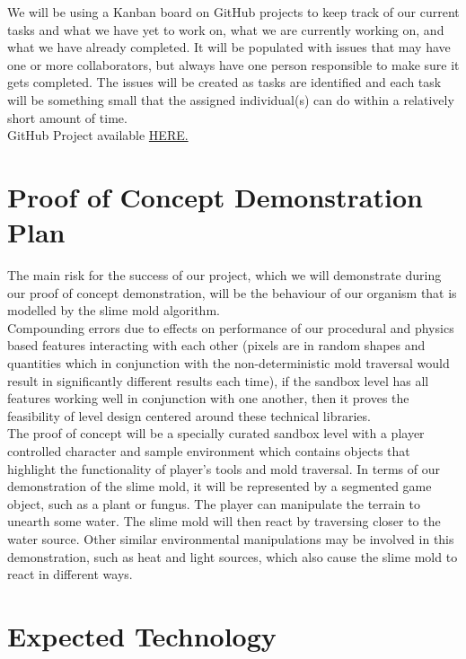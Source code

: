 \documentclass{article}
\begin{document}
We will be using a Kanban board on GitHub projects to keep track of our current tasks and what we have yet to work on, what we are currently working on, and what we have already completed. It will be populated with issues that may have one or more collaborators, but always have one person responsible to make sure it gets completed. The issues will be created as tasks are identified and each task will be something small that the assigned individual(s) can do within a relatively short amount of time.\\

GitHub Project available \href{https://github.com/users/felix-hurst/projects/2}{HERE.}

\section{Proof of Concept Demonstration Plan}

The main risk for the success of our project, which we will demonstrate during our proof of concept demonstration, will be the behaviour of our organism that is modelled by the slime mold algorithm.\\

Compounding errors due to effects on performance of our procedural and physics based features interacting with each other (pixels are in random shapes and quantities which in conjunction with the non-deterministic mold traversal would result in significantly different results each time), if the sandbox level has all features working well in conjunction with one another, then it proves the feasibility of level design centered around these technical libraries.\\

The proof of concept will be a specially curated sandbox level with a player controlled character and sample environment which contains objects that highlight the functionality of player’s tools and mold traversal. In terms of our demonstration of the slime mold, it will be represented by a segmented game object, such as a plant or fungus. The player can manipulate the terrain to unearth some water. The slime mold will then react by traversing closer to the water source. Other similar environmental manipulations may be involved in this demonstration, such as heat and light sources, which also cause the slime mold to react in different ways.\\


\section{Expected Technology}
\end{document}
